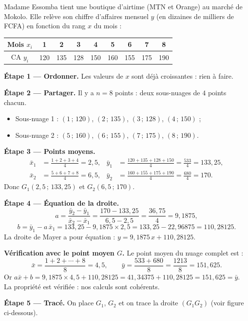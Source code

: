 \documentclass[11pt]{article}
\begin{document}
\begin{exemplebox}
Madame Essomba tient une boutique d'airtime (MTN et Orange) au marché de Mokolo. Elle relève son chiffre d'affaires mensuel $y$ (en dizaines de milliers de FCFA) en fonction du rang $x$ du mois :

\begin{center}
\begin{tabular}{|c|*{8}{c}|}
\hline
\rowcolor{popblueL} Mois $x_i$ & 1 & 2 & 3 & 4 & 5 & 6 & 7 & 8 \\
\hline
CA $y_i$ & 120 & 135 & 128 & 150 & 160 & 155 & 175 & 190 \\
\hline
\end{tabular}
\end{center}

\textbf{Étape 1 — Ordonner.} Les valeurs de $x$ sont déjà croissantes : rien à faire.

\textbf{Étape 2 — Partager.} Il y a $n = 8$ points : deux sous-nuages de $4$ points chacun.
\begin{itemize}
\item Sous-nuage 1 : $(1\,;\,120)$, $(2\,;\,135)$, $(3\,;\,128)$, $(4\,;\,150)$ ;
\item Sous-nuage 2 : $(5\,;\,160)$, $(6\,;\,155)$, $(7\,;\,175)$, $(8\,;\,190)$.
\end{itemize}

\textbf{Étape 3 — Points moyens.}
\begin{align*}
\bar{x}_1 &= \frac{1+2+3+4}{4} = 2{,}5, & \bar{y}_1 &= \frac{120+135+128+150}{4} = \frac{533}{4} = 133{,}25, \\
\bar{x}_2 &= \frac{5+6+7+8}{4} = 6{,}5, & \bar{y}_2 &= \frac{160+155+175+190}{4} = \frac{680}{4} = 170.
\end{align*}
Donc $G_1(2{,}5\,;\,133{,}25)$ et $G_2(6{,}5\,;\,170)$.

\textbf{Étape 4 — Équation de la droite.}
\[ a = \frac{\bar{y}_2 - \bar{y}_1}{\bar{x}_2 - \bar{x}_1} = \frac{170 - 133{,}25}{6{,}5 - 2{,}5} = \frac{36{,}75}{4} = 9{,}1875, \]
\[ b = \bar{y}_1 - a\,\bar{x}_1 = 133{,}25 - 9{,}1875 \times 2{,}5 = 133{,}25 - 22{,}96875 = 110{,}28125. \]
La droite de Mayer a pour équation : $\boxed{y = 9{,}1875\,x + 110{,}28125}$.

\textbf{Vérification avec le point moyen $G$.} Le point moyen du nuage complet est :
\[ \bar{x} = \frac{1+2+\cdots+8}{8} = 4{,}5, \qquad \bar{y} = \frac{533 + 680}{8} = \frac{1213}{8} = 151{,}625. \]
Or $a\bar{x} + b = 9{,}1875 \times 4{,}5 + 110{,}28125 = 41{,}34375 + 110{,}28125 = 151{,}625 = \bar{y}$. La propriété est vérifiée : nos calculs sont cohérents.

\textbf{Étape 5 — Tracé.} On place $G_1$, $G_2$ et on trace la droite $(G_1G_2)$ (voir figure ci-dessous).
\end{exemplebox}
\end{document}
